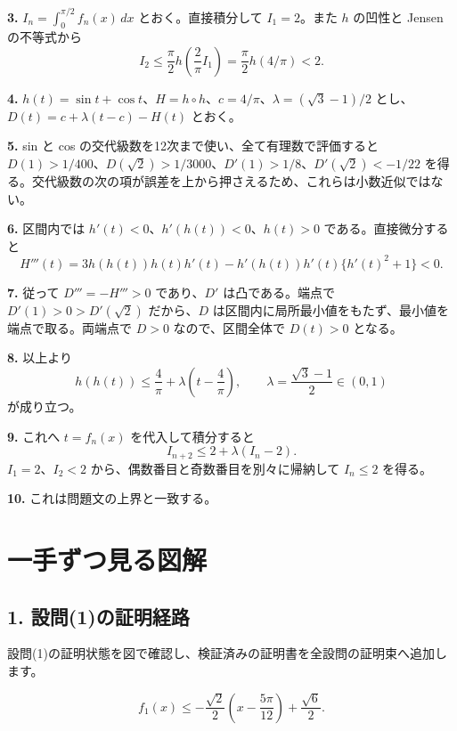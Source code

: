 \documentclass[uplatex,dvipdfmx,11pt]{jsarticle}
\begin{document}
\textbf{3.} \(I_n=\int_0^{\pi/2}f_{n}(x)\,dx\) とおく。直接積分して \(I_1=2\)。また \(h\) の凹性と Jensen の不等式から \[I_2\le\frac\pi2h\left(\frac2\pi I_1\right)=\frac\pi2h(4/\pi)<2.\]

\textbf{4.} \(h(t)=\sin t+\cos t\)、\(H=h\circ h\)、\(c=4/\pi\)、\(\lambda=(\sqrt3-1)/2\) とし、\(D(t)=c+\lambda(t-c)-H(t)\) とおく。

\textbf{5.} sin と cos の交代級数を12次まで使い、全て有理数で評価すると \(D(1)>1/400\)、\(D(\sqrt2)>1/3000\)、\(D'(1)>1/8\)、\(D'(\sqrt2)<-1/22\) を得る。交代級数の次の項が誤差を上から押さえるため、これらは小数近似ではない。

\textbf{6.} 区間内では \(h'(t)<0\)、\(h'(h(t))<0\)、\(h(t)>0\) である。直接微分すると \[H'''(t)=3h(h(t))h(t)h'(t)-h'(h(t))h'(t)\{h'(t)^2+1\}<0.\]

\textbf{7.} 従って \(D'''=-H'''>0\) であり、\(D'\) は凸である。端点で \(D'(1)>0>D'(\sqrt2)\) だから、\(D\) は区間内に局所最小値をもたず、最小値を端点で取る。両端点で \(D>0\) なので、区間全体で \(D(t)>0\) となる。

\textbf{8.} 以上より \[h(h(t))\le\frac4\pi+\lambda\left(t-\frac4\pi\right),\qquad \lambda=\frac{\sqrt3-1}{2}\in(0,1)\] が成り立つ。

\textbf{9.} これへ \(t=f_n(x)\) を代入して積分すると \[I_{n+2}\le2+\lambda(I_n-2).\] \(I_1=2\)、\(I_2<2\) から、偶数番目と奇数番目を別々に帰納して \(I_n\le2\) を得る。

\textbf{10.} これは問題文の上界と一致する。

\clearpage

\section*{一手ずつ見る図解}

\subsection*{1. 設問(1)の証明経路}

設問(1)の証明状態を図で確認し、検証済みの証明書を全設問の証明束へ追加します。

\[f_1(x)\le-\frac{\sqrt2}2\left(x-\frac{5\pi}{12}\right)+\frac{\sqrt6}2.\]
\end{document}
